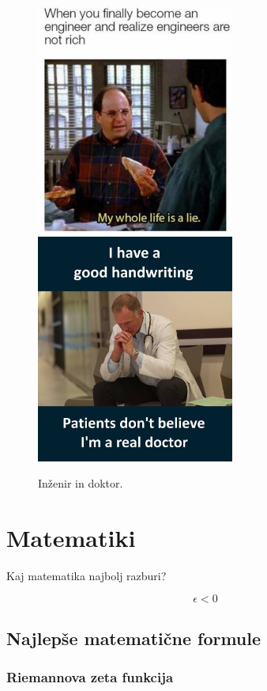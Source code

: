 \documentclass[12pt, a4paper]{article}
\begin{document}
\begin{figure}[h]
\includegraphics[width=6.5cm]{inzenir.jpg}
\ \ \ 
\includegraphics[width=6.5cm]{doktor.jpg}
\caption{Inženir in doktor.}

\end{figure}

\section{Matematiki}

Kaj matematika najbolj razburi?\footnotemark
{}

\begin{framed}
$$  \epsilon < 0 $$
\end{framed}

\subsection{Najlepše matematične formule}
\subsubsection{Riemannova zeta funkcija}
\end{document}
